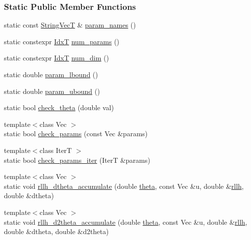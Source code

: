 \subsubsection*{Static Public Member Functions}
\begin{DoxyCompactItemize}
\item 
static const \hyperlink{namespaceprior__hessian_a61fc0176249462ee94fe3cca92cf3f8c}{String\+VecT} \& \hyperlink{classprior__hessian_1_1AMHCopula_a9982c3f1b0c8c8a44731e162c8783022}{param\+\_\+names} ()
\item 
static constexpr \hyperlink{namespaceprior__hessian_aa8d589f74e88bfa3b5750118acd1ab78}{IdxT} \hyperlink{classprior__hessian_1_1AMHCopula_ade20f55d6cbc96e29988da774b6a7cc0}{num\+\_\+params} ()
\item 
static constexpr \hyperlink{namespaceprior__hessian_aa8d589f74e88bfa3b5750118acd1ab78}{IdxT} \hyperlink{classprior__hessian_1_1AMHCopula_aaacec957c8d8e24df1100aee2694fe3a}{num\+\_\+dim} ()
\item 
static double \hyperlink{classprior__hessian_1_1AMHCopula_ae714c397e21c45b8f57e3ea58659a068}{param\+\_\+lbound} ()
\item 
static double \hyperlink{classprior__hessian_1_1AMHCopula_a7bb6324e170cdc4cc9b1721cd12e99e5}{param\+\_\+ubound} ()
\item 
static bool \hyperlink{classprior__hessian_1_1AMHCopula_a9d4b8453eedea358f829f8d4c911d8c4}{check\+\_\+theta} (double val)
\item 
{\footnotesize template$<$class Vec $>$ }\\static bool \hyperlink{classprior__hessian_1_1AMHCopula_a7052e693079deb29636e505aa37072a5}{check\+\_\+params} (const Vec \&params)
\item 
{\footnotesize template$<$class IterT $>$ }\\static bool \hyperlink{classprior__hessian_1_1AMHCopula_a5878ce4111fcb580ed74d5100aafc37b}{check\+\_\+params\+\_\+iter} (IterT \&params)
\item 
{\footnotesize template$<$class Vec $>$ }\\static void \hyperlink{classprior__hessian_1_1AMHCopula_a8602b8b27ee8b50be3dc979f8b229406}{rllh\+\_\+dtheta\+\_\+accumulate} (double \hyperlink{classprior__hessian_1_1AMHCopula_a11696b4a8cef12a30706cd745820b201}{theta}, const Vec \&u, double \&\hyperlink{classprior__hessian_1_1AMHCopula_a4c1752aeba875e7ab9563a1a7cd1524b}{rllh}, double \&dtheta)
\item 
{\footnotesize template$<$class Vec $>$ }\\static void \hyperlink{classprior__hessian_1_1AMHCopula_aee053f024e655950ad677d53e01d6b4f}{rllh\+\_\+d2theta\+\_\+accumulate} (double \hyperlink{classprior__hessian_1_1AMHCopula_a11696b4a8cef12a30706cd745820b201}{theta}, const Vec \&u, double \&\hyperlink{classprior__hessian_1_1AMHCopula_a4c1752aeba875e7ab9563a1a7cd1524b}{rllh}, double \&dtheta, double \&d2theta)
\end{DoxyCompactItemize}



